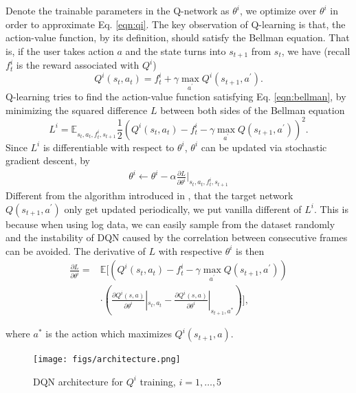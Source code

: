 \documentclass{sigchi}
\begin{document}
Denote the trainable parameters in the Q-network as $\theta^i$, we optimize over $\theta^i$ in order to approximate Eq. \eqref{eqn:qi}.
The key observation of Q-learning is that, the action-value function, by its definition, should satisfy the Bellman equation.
That is, if the user takes action $a$ and the state turns into $s_{t+1}$ from $s_t$, we have (recall $f_t^i$ is the reward associated with $Q^i$)
\begin{equation}
Q^i(s_t,a_t)=f_t^i + \gamma \max_{a^\prime}Q^i(s_{t+1}, a^\prime). \label{eqn:bellman}
\end{equation}
Q-learning tries to find the action-value function satisfying Eq. \eqref{eqn:bellman}, by minimizing the squared difference $L$ between both sides of the Bellman equation
\begin{equation*}
L^i=\mathbb{E}_{s_t, a_t, f_t^i, s_{t+1}} \frac{1}{2}(Q^i(s_t,a_t)- f_t^i - \gamma\max_{a^\prime}Q(s_{t+1}, a^\prime))^2.
\end{equation*}
Since $L^i$ is differentiable with respect to $\theta^i$, $\theta^i$ can be updated via stochastic gradient descent, by
\begin{eqnarray*}
\theta^i \leftarrow \theta^i - \alpha\frac{\partial L}{\partial \theta^i}\Big|_{s_t, a_t, f_t^i, s_{t+1}}
\end{eqnarray*}
Different from the algorithm introduced in \cite{mnih2015human}, that the target network $Q(s_{t+1}, a^\prime)$ only get updated periodically, we put vanilla different of $L^i$. 
This is because when using log data, we can easily sample from the dataset randomly and the instability of DQN caused by the correlation between consecutive frames can be avoided.
The derivative of $L$ with respective $\theta^i$ is then
\begin{equation*}
\begin{aligned}
\frac{\partial L}{\partial \theta^i} = & \mathbb{E}\Big[ (Q^i(s_t,a_t)- f_t^i - \gamma\max_{a^\prime}Q(s_{t+1}, a^\prime)) \\
& \cdot (\frac{\partial{Q^i(s,a)}}{\partial{\theta^i}}|_{s_t,a_t} - \frac{\partial{Q^i(s,a)}}{\partial{\theta^i}}|_{{s_{t+1},a^\ast}})\Big],
\end{aligned}
\end{equation*}

where $a^\ast$ is the action which maximizes $Q^i(s_{t+1},a)$.

\begin{figure}[t]
  \centering
  \texttt{[image: figs/architecture.png]}
  \caption{DQN architecture for $Q^i$ training, $i=1, \dots,5$}
  \label{fig:architecture}
\end{figure}
\end{document}
